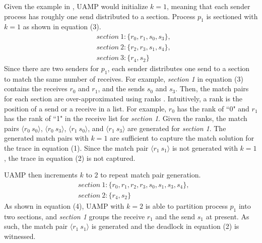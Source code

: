Given the example in , UAMP would initialize $k=1$, meaning that each sender process has roughly one send distributed to a section.  Process $p_1$ is sectioned with $k=1$ as shown in equation (3).
\begin{equation} 
\begin{split}
&\mathit{section\ 1: }\{r_0,r_1,s_0,s_3\},\\
&\mathit{section\ 2: }\{r_2,r_3,s_1,s_4\},\\ 
&\mathit{section\ 3: }\{r_4,s_2\}
\end{split}
\end{equation}
Since there are two senders for $p_1$, each sender distributes one send to a section to match the same number of receives. 
For example, \textit{section 1} in equation (3) contains the receives $r_0$ and $r_1$, and the sends $s_0$ and $s_3$. 
Then, the match pairs for each section are over-approximated using ranks \cite{DBLP:conf/kbse/HuangMM13}. Intuitively, a rank is the position of a send or a receive in a list. For example, $r_0$ has the rank of ``0" and $r_1$ has the rank of ``1" in the receive list for \textit{section 1}. Given the ranks, the match pairs $\langle r_0\ s_0\rangle$, $\langle r_0\ s_3\rangle$, $\langle r_1\ s_0\rangle$, and $\langle r_1\ s_3\rangle$ are generated for \textit{section 1}.
The generated match pairs with $k=1$ are sufficient to capture the match solution for the trace in equation (1). 
Since the match pair $\langle r_1\ s_1\rangle$ is not generated with $k=1$, the trace in equation (2) is not captured. 

UAMP then increments $k$ to $2$ to repeat match pair generation. 
\begin{equation}
\begin{split}
&\mathit{section\ 1: }\{r_0,r_1, r_2,r_3,s_0,s_1,s_3,s_4\},\\
&\mathit{section\ 2: }\{r_4,s_2\}
\end{split}
\end{equation}
As shown in equation (4), UAMP with $k=2$ is able to partition process $p_1$ into two sections, and \textit{section 1}  groups the receive $r_1$ and the send $s_1$ at present. As such, the match pair $\langle r_1\ s_1\rangle$ is generated and the deadlock in equation (2) is witnessed.


